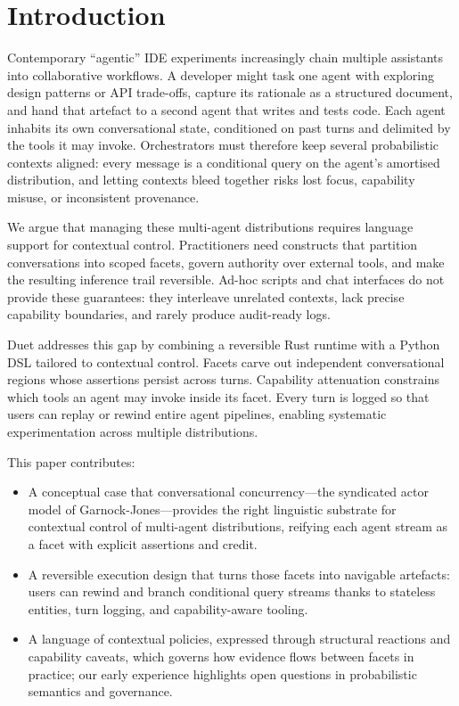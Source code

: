 \documentclass[sigplan,screen]{acmart}
\begin{document}
\section{Introduction}
\label{sec:introduction}
Contemporary “agentic” IDE experiments increasingly chain multiple assistants
into collaborative workflows. A developer might task one agent with exploring
design patterns or API trade-offs, capture its rationale as a structured
document, and hand that artefact to a second agent that writes and tests code.
Each agent inhabits its own conversational state, conditioned on past turns and
delimited by the tools it may invoke. Orchestrators must therefore keep several
probabilistic contexts aligned: every message is a conditional query on the
agent’s amortised distribution, and letting contexts bleed together risks lost
focus, capability misuse, or inconsistent provenance.

We argue that managing these multi-agent distributions requires language
support for contextual control. Practitioners need constructs that partition
conversations into scoped facets, govern authority over external tools, and make
the resulting inference trail reversible. Ad-hoc scripts and chat interfaces do
not provide these guarantees: they interleave unrelated contexts, lack precise
capability boundaries, and rarely produce audit-ready logs.

Duet addresses this gap by combining a reversible Rust runtime with a Python DSL
tailored to contextual control. Facets carve out independent conversational
regions whose assertions persist across turns. Capability attenuation constrains
which tools an agent may invoke inside its facet. Every turn is logged so that
users can replay or rewind entire agent pipelines, enabling systematic
experimentation across multiple distributions.

This paper contributes:
\begin{itemize}
  \item A conceptual case that conversational concurrency---the syndicated actor
        model of Garnock-Jones---provides the right linguistic substrate for
        contextual control of multi-agent distributions, reifying each agent
        stream as a facet with explicit assertions and credit.
  \item A reversible execution design that turns those facets into navigable
        artefacts: users can rewind and branch conditional query streams thanks
        to stateless entities, turn logging, and capability-aware tooling.
  \item A language of contextual policies, expressed through structural reactions
        and capability caveats, which governs how evidence flows between facets
        in practice; our early experience highlights open questions in probabilistic
        semantics and governance.
\end{itemize}
\end{document}
